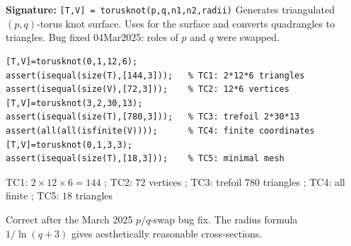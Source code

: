 \chapter{}
\begin{tcolorbox}[Abox,title={Analysis}]
\textbf{Signature:} \lstinline|[T,V] = torusknot(p,q,n1,n2,radii)|\quad
Generates triangulated $(p,q)$-torus knot surface. Uses  for the surface and converts quadrangles to triangles. Bug fixed 04Mar2025: roles of $p$ and $q$ were swapped.
\end{tcolorbox}
\begin{lstlisting}[caption={Tests for torusknot.m}]
[T,V]=torusknot(0,1,12,6);
assert(isequal(size(T),[144,3]));   % TC1: 2*12*6 triangles
assert(isequal(size(V),[72,3]));    % TC2: 12*6 vertices
[T,V]=torusknot(3,2,30,13);
assert(isequal(size(T),[780,3]));   % TC3: trefoil 2*30*13
assert(all(all(isfinite(V))));      % TC4: finite coordinates
[T,V]=torusknot(0,1,3,3);
assert(isequal(size(T),[18,3]));    % TC5: minimal mesh
\end{lstlisting}
\begin{tcolorbox}[Pbox,title={TC1--TC5 -- All pass}]
TC1: $2\times12\times6=144$ \APROVADO; TC2: $72$ vertices \APROVADO; TC3: trefoil $780$ triangles \APROVADO; TC4: all finite \APROVADO; TC5: $18$ triangles \APROVADO
\end{tcolorbox}
\begin{concl}
Correct after the March 2025 $p/q$-swap bug fix. The radius formula $1/\ln(q+3)$ gives aesthetically reasonable cross-sections.
\end{concl}

